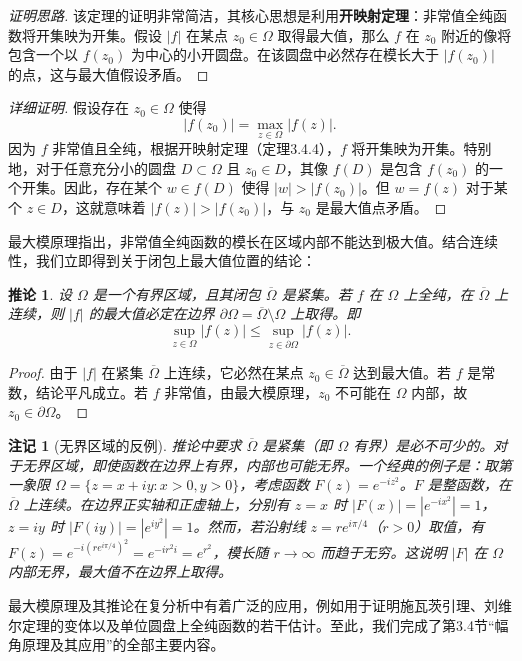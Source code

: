 \documentclass[UTF8]{ctexart}
\newtheorem{corollary}[theorem]{推论}
\newtheorem{remark}{注记}[section]
\numberwithin{equation}{section}
\begin{document}
\begin{proof}[证明思路]
该定理的证明非常简洁，其核心思想是利用\textbf{开映射定理}：非常值全纯函数将开集映为开集。假设 $|f|$ 在某点 $z_0 \in \Omega$ 取得最大值，那么 $f$ 在 $z_0$ 附近的像将包含一个以 $f(z_0)$ 为中心的小开圆盘。在该圆盘中必然存在模长大于 $|f(z_0)|$ 的点，这与最大值假设矛盾。
\end{proof}

\begin{proof}[详细证明]
假设存在 $z_0 \in \Omega$ 使得
\[
|f(z_0)| = \max_{z \in \Omega} |f(z)|.
\]
因为 $f$ 非常值且全纯，根据开映射定理（定理3.4.4），$f$ 将开集映为开集。特别地，对于任意充分小的圆盘 $D \subset \Omega$ 且 $z_0 \in D$，其像 $f(D)$ 是包含 $f(z_0)$ 的一个开集。因此，存在某个 $w \in f(D)$ 使得 $|w| > |f(z_0)|$。但 $w = f(z)$ 对于某个 $z \in D$，这就意味着 $|f(z)| > |f(z_0)|$，与 $z_0$ 是最大值点矛盾。
\end{proof}

最大模原理指出，非常值全纯函数的模长在区域内部不能达到极大值。结合连续性，我们立即得到关于闭包上最大值位置的结论：

\begin{corollary}
设 $\Omega$ 是一个有界区域，且其闭包 $\overline{\Omega}$ 是紧集。若 $f$ 在 $\Omega$ 上全纯，在 $\overline{\Omega}$ 上连续，则 $|f|$ 的最大值必定在边界 $\partial \Omega = \overline{\Omega} \setminus \Omega$ 上取得。即
\[
\sup_{z \in \Omega} |f(z)| \le \sup_{z \in \partial \Omega} |f(z)|.
\]
\end{corollary}

\begin{proof}
由于 $|f|$ 在紧集 $\overline{\Omega}$ 上连续，它必然在某点 $z_0 \in \overline{\Omega}$ 达到最大值。若 $f$ 是常数，结论平凡成立。若 $f$ 非常值，由最大模原理，$z_0$ 不可能在 $\Omega$ 内部，故 $z_0 \in \partial \Omega$。
\end{proof}

\begin{remark}[无界区域的反例]
推论中要求 $\overline{\Omega}$ 是紧集（即 $\Omega$ 有界）是必不可少的。对于无界区域，即使函数在边界上有界，内部也可能无界。一个经典的例子是：取第一象限 $\Omega = \{ z = x+iy : x>0, y>0 \}$，考虑函数 $F(z) = e^{-iz^2}$。$F$ 是整函数，在 $\overline{\Omega}$ 上连续。在边界正实轴和正虚轴上，分别有 $z=x$ 时 $|F(x)| = |e^{-ix^2}| = 1$，$z=iy$ 时 $|F(iy)| = |e^{iy^2}| = 1$。然而，若沿射线 $z = r e^{i\pi/4}$（$r>0$）取值，有 $F(z) = e^{-i(r e^{i\pi/4})^2} = e^{-i r^2 i} = e^{r^2}$，模长随 $r \to \infty$ 而趋于无穷。这说明 $|F|$ 在 $\Omega$ 内部无界，最大值不在边界上取得。
\end{remark}

最大模原理及其推论在复分析中有着广泛的应用，例如用于证明施瓦茨引理、刘维尔定理的变体以及单位圆盘上全纯函数的若干估计。至此，我们完成了第3.4节“幅角原理及其应用”的全部主要内容。
\end{document}
